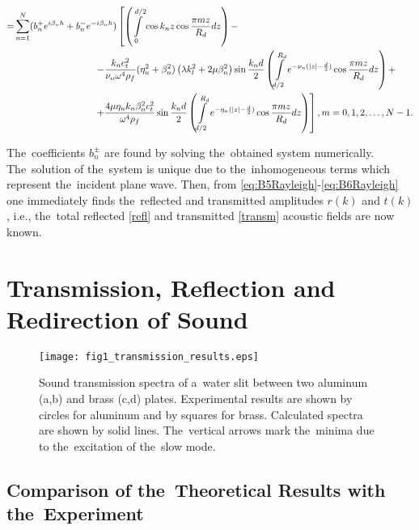 \begin{align}
=
&\sum\limits_{n=1}^{N}({b_n^+}e^{i\beta_nh}+{b_n^-}e^{-i\beta_nh})\left[\left(\int\limits_0^{d/2}\cos{k_nz}\cos{\frac{\pi mz}{R_d}}dz\right)
-\right. \notag\\
%
&\hspace{3cm} \left.-\frac{k_n c_t^2}{\nu_n\omega^4\rho_f}(\eta_n^2+\beta_n^2)\left(\lambda k_l^2+2\mu\beta_n^2\right)\sin\frac{k_nd}{2}\left(\int\limits_{d/2}^{R_d}e^{-\nu_n (|z|-\frac{d}{2})}\cos{\frac{\pi mz}{R_d}}dz\right)+\right. \notag \\
&\hspace{3cm} \left.+\frac{4\mu \eta_n k_n\beta_n^2 c_t^2}{\omega^4\rho_f}\sin\frac{k_nd}{2} \left(\int\limits_{d/2}^{R_d}e^{-\eta_n (|z|-\frac{d}{2})}\cos{\frac{\pi mz}{R_d}}dz\right)\right],m=0,1,2,\dots,N-1. \notag
\end{align}

The~coefficients $b_n^{\pm}$ are found by solving the~obtained system numerically.
The~solution of the~system is unique due to the~inhomogeneous terms which represent the~incident plane wave.
Then, from \cref{eq:B5Rayleigh}-\cref{eq:B6Rayleigh} one immediately finds the~reflected and transmitted amplitudes $r(k)$ and $t(k)$, i.e., the~total reflected \cref{refl} and transmitted \cref{transm} acoustic fields are now known.


\section{Transmission, Reflection and Redirection of Sound}

\begin{figure}
\begin{center}
\texttt{[image: fig1\_transmission\_results.eps]}
\caption{Sound transmission spectra of a~water slit between two aluminum (a,b) and brass (c,d) plates. Experimental results are shown by circles for aluminum and by squares for brass. Calculated spectra are shown by solid lines. The~vertical arrows mark the~minima due to the~excitation of the~slow mode.}
\label{fig:theoryexperimentRayleigh}
\end{center}
\end{figure}

\subsection{Comparison of the~Theoretical Results with the~Experiment}

